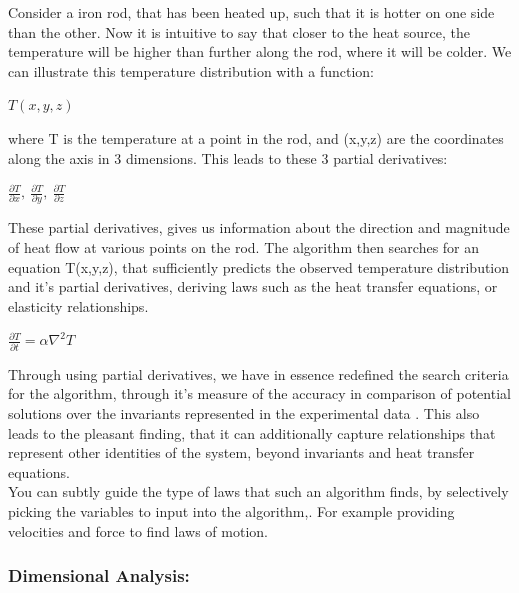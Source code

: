 \documentclass{article}
\begin{document}
Consider a iron rod, that has been heated up, such that it is hotter on one side than the other. Now it is intuitive to say that closer to the heat source, the temperature will be higher than further along the rod, where it will be colder. We can illustrate this temperature distribution with a function:  \\


\begin{center}
$T(x,y,z)$
\end{center}

where T is the temperature at a point in the rod, and (x,y,z) are the coordinates along the axis in 3 dimensions. This leads to these 3 partial derivatives: \\ 

\begin{center}
 $\frac{\partial T}{\partial x}, \  \frac{\partial T}{\partial y}, \  \frac{\partial T}{\partial z}$
\end{center}

These partial derivatives, gives us information about the direction and magnitude of heat flow at various points on the rod. The algorithm then searches for an equation T(x,y,z), that sufficiently predicts the observed temperature distribution and it's partial derivatives, deriving laws such as the heat transfer equations, or elasticity relationships.\\ 

\begin{center}
$\frac{\partial T}{\partial t} = \alpha \nabla^2 T$
\end{center}



Through using partial derivatives, we have in essence redefined the search criteria for the algorithm, through it's measure of the accuracy in comparison of potential solutions over the invariants represented in the experimental data \cite{Kelly2021} . This also leads to the pleasant finding, that it can additionally capture relationships that represent other identities of the system, beyond invariants and heat transfer equations. \\ 

You can subtly guide the type of laws that such an algorithm finds, by selectively picking the variables to input into the algorithm,. For example providing velocities and force to find laws of motion. \\ 




\subsubsection{Dimensional Analysis: }
\end{document}
